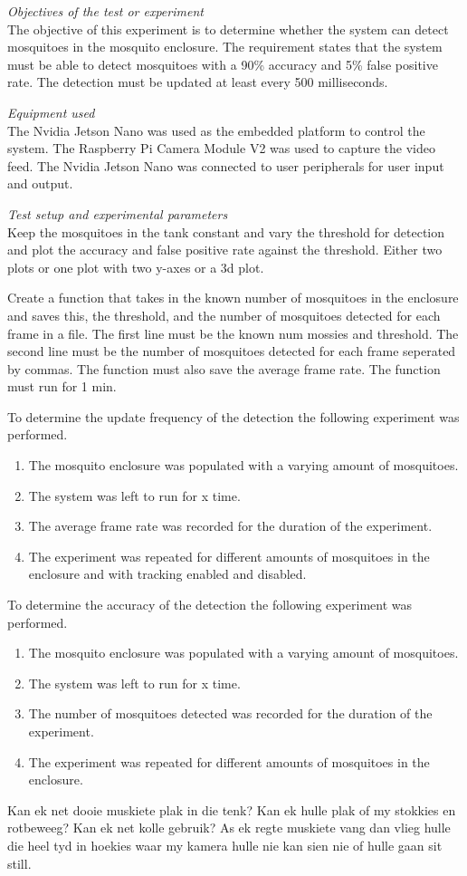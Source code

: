 \textit{Objectives of the test or experiment}\\
The objective of this experiment is to determine whether the system can detect mosquitoes in the mosquito enclosure. The requirement states that the system must be able to detect mosquitoes with a 90\% accuracy and 5\% false positive rate. The detection must be updated at least every 500 milliseconds.

\textit{Equipment used}\\
The Nvidia Jetson Nano was used as the embedded platform to control the system. The Raspberry Pi Camera Module V2 was used to capture the video feed. The Nvidia Jetson Nano was connected to user peripherals for user input and output.

\textit{Test setup and experimental parameters}\\
Keep the mosquitoes in the tank constant and vary the threshold for detection and plot the accuracy and false positive rate against the threshold. Either two plots or one plot with two y-axes or a 3d plot.

Create a function that takes in the known number of mosquitoes in the enclosure and saves this, the threshold, and the number of mosquitoes detected for each frame in a file. The first line must be the known num mossies and threshold. The second line must be the number of mosquitoes detected for each frame seperated by commas. The function must also save the average frame rate. The function must run for 1 min.


To determine the update frequency of the detection the following experiment was performed.
\begin{enumerate}
  \item The mosquito enclosure was populated with a varying amount of mosquitoes.
  \item The system was left to run for x time.
  \item The average frame rate was recorded for the duration of the experiment.
  \item The experiment was repeated for different amounts of mosquitoes in the enclosure and with tracking enabled and disabled.
\end{enumerate}

To determine the accuracy of the detection the following experiment was performed.
\begin{enumerate}
  \item The mosquito enclosure was populated with a varying amount of mosquitoes.
  \item The system was left to run for x time.
  \item The number of mosquitoes detected was recorded for the duration of the experiment.
  \item The experiment was repeated for different amounts of mosquitoes in the enclosure.
\end{enumerate}
Kan ek net dooie muskiete plak in die tenk? Kan ek hulle plak of my stokkies en rotbeweeg? Kan ek net kolle gebruik? As ek regte muskiete vang dan vlieg hulle die heel tyd in hoekies waar my kamera hulle nie kan sien nie of hulle gaan sit still.

